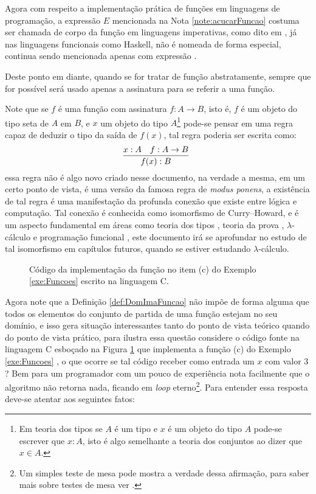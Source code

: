 Agora com respeito a implementação prática de funções em linguagens de programação, a expressão $E$ mencionada na Nota \ref{note:acucarFuncao} costuma ser chamada de corpo da função em linguagens imperativas, como dito em \cite{pythonOrg, medina2006}, já nas linguagens funcionais como Haskell, não é nomeada de forma especial, continua sendo mencionada apenas com expressão \cite{learnHaskell2011, beginningHaskell}.

\begin{dica}
  Deste ponto em diante, quando se for tratar de função abstratamente, sempre que for possível será usado apenas a assinatura para se referir a uma função.
\end{dica}

Note que se $f$ é uma função com assinatura $f: A \rightarrow B$, isto é, $f$ é um objeto do tipo seta de $A$ em $B$, e $x$ um objeto do tipo $A$\footnote{Em teoria dos tipos \cite{nederpelt2014, thompson1999} se $A$ é um tipo e $x$ é um objeto do tipo $A$ pode-se escrever que $x:A$, isto é algo semelhante a teoria dos conjuntos ao dizer que $x \in A$.} pode-se pensar em uma regra capaz de deduzir o tipo da saída de $f(x)$, tal regra poderia ser escrita como:
\begin{equation*}
	\infer[ ]{f(x):B}{x:A & f:A \rightarrow B}
\end{equation*}
essa regra não é algo novo criado nesse documento, na verdade a mesma, em um certo ponto de vista, é uma versão da famosa regra de \textit{modus ponens}, a existência de tal regra é uma manifestação da profunda conexão que existe entre lógica e computação. Tal conexão é conhecida como isomorfismo de Curry–Howard, e é um aspecto fundamental em áreas como teoria dos tipos \cite{nederpelt2014, thompson1999}, teoria da prova \cite{nederpelt2014, sergey2014}, $\lambda$-cálculo \cite{bare1984, henk1992, bimbo2019} e programação funcional \cite{thompson1999, fmcbook}, este documento irá se aprofundar no estudo de tal isomorfismo em capítulos futuros, quando se estiver estudando $\lambda$-cálculo.

\begin{figure}[h]
	
	\caption{Código da implementação da função no item (c) do Exemplo \ref{exe:Funcoes} escrito na linguagem C.}
	\label{fig:FuncaoSqrt}
\end{figure}

Agora note que a Definição \ref{def:DomImaFuncao} não impõe de forma alguma que todos os elementos do conjunto de partida de uma função estejam no seu domínio, e isso gera situação interessantes tanto do ponto de vista teórico quando do ponto de vista prático, para ilustra essa questão considere o código fonte na linguagem C esboçado na Figura \ref{fig:FuncaoSqrt} que implementa a função (c) do Exemplo \ref{exe:Funcoes} , o que ocorre se tal código receber como entrada um $x$ com valor $3$? Bem para um programador com um pouco de experiência nota facilmente que o algoritmo não retorna nada, ficando em \textit{loop} eterno\footnote{Um simples teste de mesa pode mostra a verdade dessa afirmação, para saber mais sobre testes de mesa ver \cite{medina2006}.}. Para entender essa resposta deve-se atentar aos seguintes fatos:

